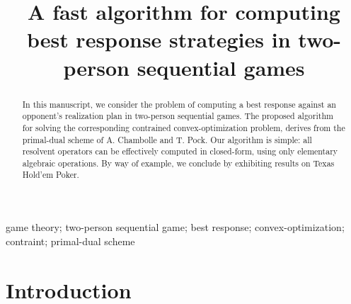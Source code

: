 \documentclass[a4paper,10pt,journal]{IEEEtran}
\begin{document}
\title{A fast algorithm for computing best response strategies in two-person sequential games}


\author{}


\maketitle

\begin{abstract}
% 
In this manuscript, we consider the problem of computing a best response against an opponent's realization plan in two-person sequential games.
The proposed algorithm for solving the corresponding contrained convex-optimization problem, derives from the primal-dual scheme of A. Chambolle and T. Pock.
Our algorithm is simple: all resolvent operators can be effectively computed in closed-form, using only elementary algebraic operations.
By way of example, we conclude by exhibiting results on Texas Hold'em Poker.
\end{abstract}


\begin{IEEEkeywords}
  game theory; two-person sequential game; best response; convex-optimization; contraint; primal-dual scheme
\end{IEEEkeywords}

\section{Introduction}
\end{document}
